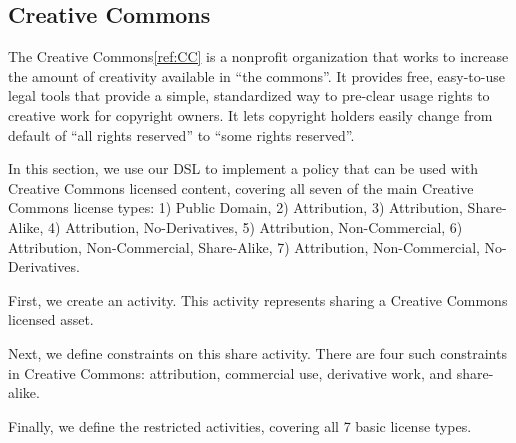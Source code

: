 \subsection{Creative Commons}\label{sec:model-cc}

The Creative Commons\ref{ref:CC} is a nonprofit organization that works to
increase the amount of creativity available in ``the commons''.  It provides
free, easy-to-use legal tools that provide a simple, standardized way to
pre-clear usage rights to creative work for copyright owners.  It lets
copyright holders easily change from default of ``all rights reserved'' to
``some rights reserved''.

In this section, we use our DSL to implement a policy that can be used with
Creative Commons licensed content, covering all seven of the main Creative
Commons license types: 1) Public Domain, 2) Attribution, 3) Attribution, Share-Alike,
4) Attribution, No-Derivatives, 5) Attribution, Non-Commercial,
6) Attribution, Non-Commercial, Share-Alike,
7) Attribution, Non-Commercial, No-Derivatives.


First, we create an activity.  This activity represents sharing a Creative
Commons licensed asset.



Next, we define constraints on this share activity.  There are four such
constraints in Creative Commons: attribution, commercial use, derivative work,
and share-alike.



Finally, we define the restricted activities, covering all 7 basic license
types.


